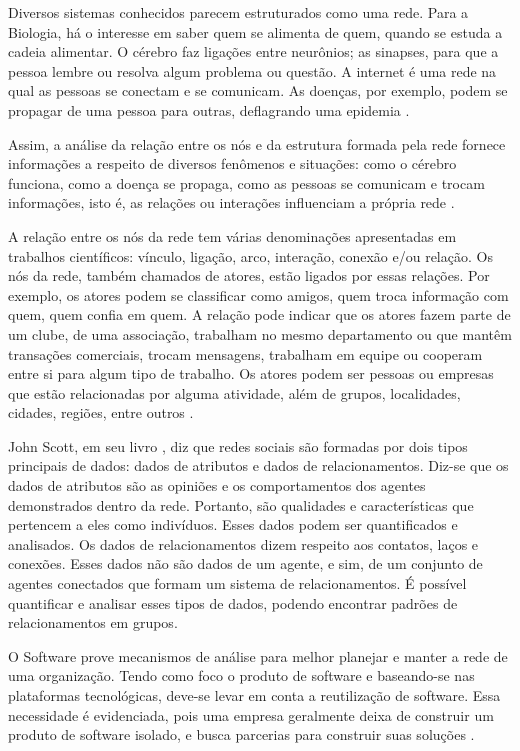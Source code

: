 Diversos sistemas conhecidos parecem estruturados como uma rede. Para a Biologia, há o interesse em saber quem se alimenta de quem, quando se estuda a cadeia alimentar. O cérebro faz ligações entre neurônios; as sinapses, para que a pessoa lembre ou resolva algum problema ou questão. A internet é uma rede na qual as pessoas se conectam e se comunicam. As doenças, por exemplo, podem se propagar de uma pessoa para outras, deflagrando uma epidemia \cite{Goular:2014}.

Assim, a análise da relação entre os nós e da estrutura formada pela rede fornece informações a respeito de diversos fenômenos e situações: como o cérebro funciona, como a doença se propaga, como as pessoas se comunicam e trocam informações, isto é, as relações ou interações influenciam a própria rede \cite{Goular:2014}.

A relação entre os nós da rede tem várias denominações apresentadas em trabalhos científicos: vínculo, ligação, arco, interação, conexão e/ou relação. Os nós da rede, também chamados de atores, estão ligados por essas relações. Por exemplo, os atores podem se classificar como amigos, quem troca informação com quem, quem confia em quem. A relação pode indicar que os atores fazem parte de um clube, de uma associação, trabalham no mesmo departamento ou que mantêm transações comerciais, trocam mensagens, trabalham em equipe ou cooperam entre si para algum tipo de trabalho. Os atores podem ser pessoas ou empresas que estão relacionadas por alguma atividade, além de grupos, localidades, cidades, regiões, entre outros \cite{Hanneman:Riddle:2005}.

John Scott, em seu livro \cite{Scott:Carrington:2011}, diz que redes sociais são formadas por dois tipos principais de dados: dados de atributos e dados de relacionamentos. Diz-se que os dados de atributos são as opiniões e os comportamentos dos agentes demonstrados dentro da rede. Portanto, são qualidades e características que pertencem a eles como indivíduos. Esses dados podem ser quantificados e analisados. Os dados de relacionamentos dizem respeito aos contatos, laços e conexões. Esses dados não são dados de um agente, e sim, de um conjunto de agentes conectados que formam um sistema de relacionamentos. É possível quantificar e analisar esses tipos de dados, podendo encontrar padrões de relacionamentos em grupos.

O Software prove mecanismos de análise para melhor planejar e manter a rede de uma organização. Tendo como foco o produto de software e baseando-se nas plataformas tecnológicas, deve-se levar em conta a reutilização de software. Essa necessidade é evidenciada, pois uma empresa geralmente deixa de construir um produto de software isolado, e busca parcerias para construir suas soluções \cite{Lima:2015}.

